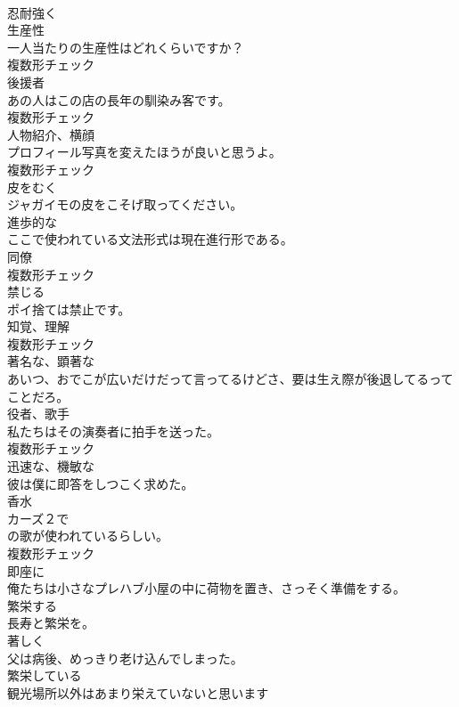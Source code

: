 \documentclass[8pt]{extreport}
\begin{document}
\begin{CJK}{UTF8}{min}
\\	[副詞]	忍耐強く	
\\	[名詞]	生産性	
\\	一人当たりの生産性はどれくらいですか？	
\\	複数形チェック
\\	[名詞]	後援者	
\\	あの人はこの店の長年の馴染み客です。	
\\	複数形チェック
\\	[名詞]	人物紹介、横顔	
\\	プロフィール写真を変えたほうが良いと思うよ。	
\\	複数形チェック
\\	[動詞]	皮をむく	
\\	ジャガイモの皮をこそげ取ってください。	
\\	[形容詞]	進歩的な	
\\	ここで使われている文法形式は現在進行形である。	
\\	[名詞]	同僚	
\\	複数形チェック
\\	[動詞]	禁じる	
\\	ポイ捨ては禁止です。	
\\	[名詞]	知覚、理解	
\\	複数形チェック
\\	[形容詞]	著名な、顕著な	
\\	あいつ、おでこが広いだけだって言ってるけどさ、要は生え際が後退してるってことだろ。	
\\	[名詞]	役者、歌手	
\\	私たちはその演奏者に拍手を送った。	
\\	複数形チェック
\\	[形容詞]	迅速な、機敏な	
\\	彼は僕に即答をしつこく求めた。	
\\	[名詞]	香水	
\\	カーズ２で
\\	の歌が使われているらしい。	
\\	複数形チェック
\\	[副詞]	即座に	
\\	俺たちは小さなプレハブ小屋の中に荷物を置き、さっそく準備をする。	
\\	[動詞]	繁栄する	
\\	長寿と繁栄を。	
\\	[副詞]	著しく	
\\	父は病後、めっきり老け込んでしまった。	
\\	[形容詞]	繁栄している	
\\	観光場所以外はあまり栄えていないと思います	

\end{CJK}
\end{document}
